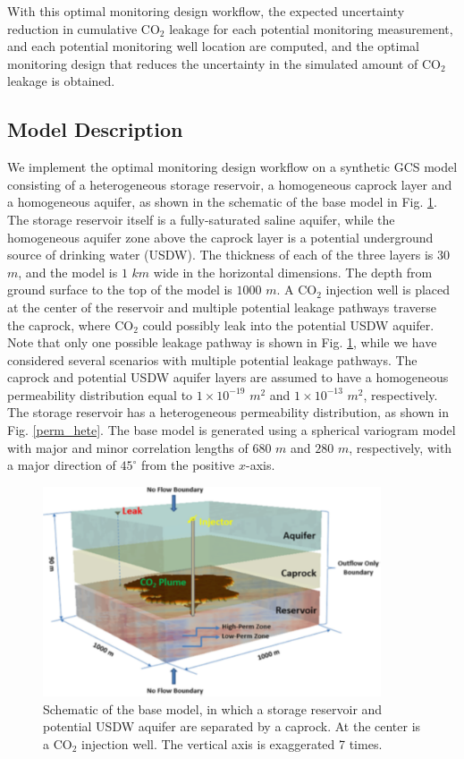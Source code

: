 \documentclass[a4paper,fleqn]{cas-sc}
\begin{document}
With this optimal monitoring design workflow, the expected uncertainty reduction in cumulative CO$_2$ leakage for each potential monitoring measurement, and each potential monitoring well location are computed, and the optimal monitoring design that reduces the uncertainty in the simulated amount of CO$_2$ leakage is obtained.

\subsection{Model Description}
We implement the optimal monitoring design workflow on a synthetic GCS model consisting of a heterogeneous storage reservoir, a homogeneous caprock layer and a homogeneous aquifer, as shown in the schematic of the base model in Fig. \ref{model}. The storage reservoir itself is a fully-saturated saline aquifer, while the homogeneous aquifer zone above the caprock layer is a potential underground source of drinking water (USDW). The thickness of each of the three layers is $30$ $m$, and the model is $1$ $km$ wide in the horizontal dimensions. The depth from ground surface to the top of the model is $1000$ $m$. A CO$_2$ injection well is placed at the center of the reservoir and multiple potential leakage pathways traverse the caprock, where CO$_2$ could possibly leak into the potential USDW aquifer. Note that only one possible leakage pathway is shown in Fig. \ref{model}, while we have considered several scenarios with multiple potential leakage pathways. The caprock and potential USDW aquifer layers are assumed to have a homogeneous permeability distribution equal to $1\times10^{-19}$ $m^2$ and $1\times10^{-13}$ $m^2$, respectively. The storage reservoir has a heterogeneous permeability distribution, as shown in Fig. \ref{perm_hete}. The base model is generated using a spherical variogram model \citep{Caers2005, Chen2017623} with major and minor correlation lengths of $680$ $m$ and $280$ $m$, respectively, with a major direction of $45^\circ$ from the positive $x$-axis.

\begin{figure}
    \centering
    \includegraphics[width=10cm]{figs/Figure 5.pdf}
    \caption{Schematic of the base model, in which a storage reservoir and potential USDW aquifer are separated by a caprock. At the center is a CO$_2$ injection well. The vertical axis is exaggerated 7 times.}
    \label{model}
\end{figure}
\end{document}

